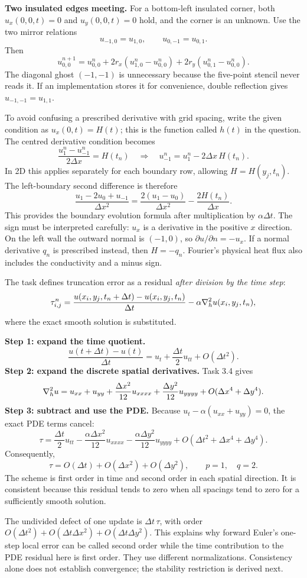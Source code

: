 \textbf{Two insulated edges meeting.}
For a bottom-left insulated corner, both $u_x(0,0,t)=0$ and $u_y(0,0,t)=0$ hold, and the corner
is an unknown. Use the two mirror relations
\[
u_{-1,0}=u_{1,0},\qquad u_{0,-1}=u_{0,1}.
\]
Then
\[
\boxed{u^{n+1}_{0,0}=u^n_{0,0}
+2r_x(u^n_{1,0}-u^n_{0,0})+2r_y(u^n_{0,1}-u^n_{0,0}).}
\]
The diagonal ghost $( -1,-1)$ is unnecessary because the five-point stencil never reads it.
If an implementation stores it for convenience, double reflection gives $u_{-1,-1}=u_{1,1}$.

To avoid confusing a prescribed derivative with grid spacing, write the given condition as
$u_x(0,t)=H(t)$; this is the function called $h(t)$ in the question.
The centred derivative condition becomes
\[
\frac{u^n_1-u^n_{-1}}{2\Delta x}=H(t_n)
\quad\Longrightarrow\quad
\boxed{u^n_{-1}=u^n_1-2\Delta x\,H(t_n).}
\]
In 2D this applies separately for each boundary row, allowing $H=H(y_j,t_n)$.
The left-boundary second difference is therefore
\[
\frac{u_1-2u_0+u_{-1}}{\Delta x^2}
=\frac{2(u_1-u_0)}{\Delta x^2}-\frac{2H(t_n)}{\Delta x}.
\]
This provides the boundary evolution formula after multiplication by $\alpha\Delta t$.
The sign must be interpreted carefully: $u_x$ is a derivative in the positive $x$ direction.
On the left wall the outward normal is $(-1,0)$, so $\partial u/\partial n=-u_x$.
If a normal derivative $q_n$ is prescribed instead, then $H=-q_n$.
Fourier's physical heat flux also includes the conductivity and a minus sign.

The task defines truncation error as a residual \emph{after division by the time step}:
\[
\tau^n_{i,j}=\frac{u(x_i,y_j,t_n+\Delta t)-u(x_i,y_j,t_n)}{\Delta t}
-\alpha\nabla^2_hu(x_i,y_j,t_n),
\]
where the exact smooth solution is substituted.

\textbf{Step 1: expand the time quotient.}
\[
\frac{u(t+\Delta t)-u(t)}{\Delta t}
=u_t+\frac{\Delta t}{2}u_{tt}+O(\Delta t^2).
\]
\textbf{Step 2: expand the discrete spatial derivatives.}
Task 3.4 gives
\[
\nabla^2_hu=u_{xx}+u_{yy}
+\frac{\Delta x^2}{12}u_{xxxx}
+\frac{\Delta y^2}{12}u_{yyyy}
+O(\Delta x^4+\Delta y^4).
\]
\textbf{Step 3: subtract and use the PDE.}
Because $u_t-\alpha(u_{xx}+u_{yy})=0$, the exact PDE terms cancel:
\[
\boxed{\tau=
\frac{\Delta t}{2}u_{tt}
-\frac{\alpha\Delta x^2}{12}u_{xxxx}
-\frac{\alpha\Delta y^2}{12}u_{yyyy}
+O(\Delta t^2+\Delta x^4+\Delta y^4).}
\]
Consequently,
\[
\boxed{\tau=O(\Delta t)+O(\Delta x^2)+O(\Delta y^2),\qquad p=1,\quad q=2.}
\]
The scheme is first order in time and second order in each spatial direction. It is consistent
because this residual tends to zero when all spacings tend to zero for a sufficiently smooth solution.

The undivided defect of one update is $\Delta t\,\tau$, with order
$O(\Delta t^2)+O(\Delta t\Delta x^2)+O(\Delta t\Delta y^2)$.
This explains why forward Euler's one-step local error can be called second order while the
time contribution to the PDE residual here is first order. They use different normalizations.
Consistency alone does not establish convergence; the stability restriction is derived next.
